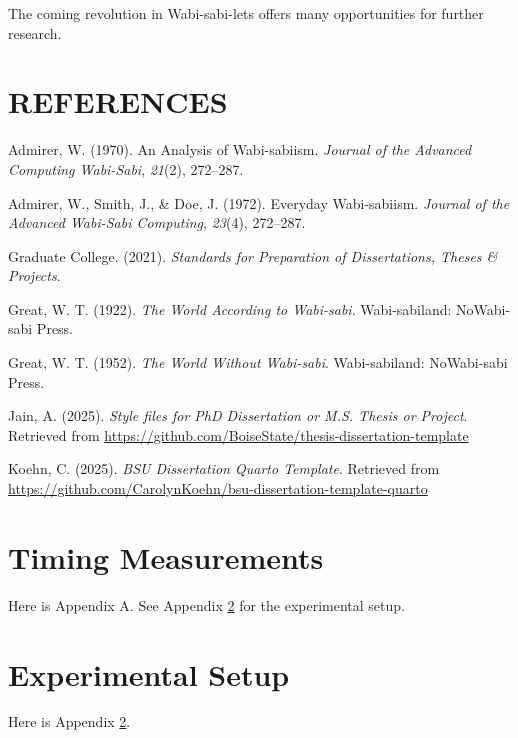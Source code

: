 \documentclass[
  dissertation]{bsu-cs}
\newlength{\cslhangindent}
\newenvironment{CSLReferences}[2] %
 {\begin{list}{}{%
  \setlength{\itemindent}{0pt}
  \setlength{\leftmargin}{0pt}
  \setlength{\parsep}{0pt}
  \ifodd #1
   \setlength{\leftmargin}{\cslhangindent}
   \setlength{\itemindent}{-1\cslhangindent}
  \fi
  \setlength{\itemsep}{#2\baselineskip}}}
 {\end{list}}
\begin{document}
The coming revolution in Wabi-sabi-lets offers many opportunities for
further research.

\backmatter

\chapter*{REFERENCES}

\label{refs}
\begin{CSLReferences}{1}{0}
Admirer, W. (1970). An {A}nalysis of {W}abi-sabiism. \emph{Journal of
the Advanced Computing Wabi-Sabi}, \emph{21}(2), 272--287.

Admirer, W., Smith, J., \& Doe, J. (1972). Everyday {W}abi-sabiism.
\emph{Journal of the Advanced Wabi-Sabi Computing}, \emph{23}(4),
272--287.

Graduate College. (2021). \emph{Standards for {P}reparation of
{D}issertations, {T}heses \& {P}rojects}.

Great, W. T. (1922). \emph{The {W}orld {A}ccording to {W}abi-sabi}.
Wabi-sabiland: NoWabi-sabi Press.

Great, W. T. (1952). \emph{The {W}orld {W}ithout {W}abi-sabi}.
Wabi-sabiland: NoWabi-sabi Press.

Jain, A. (2025). \emph{Style files for PhD {D}issertation or {M.S.}
Thesis or {P}roject}. Retrieved from
\url{https://github.com/BoiseState/thesis-dissertation-template}

Koehn, C. (2025). \emph{{BSU} {D}issertation {Q}uarto {T}emplate}.
Retrieved from
\url{https://github.com/CarolynKoehn/bsu-dissertation-template-quarto}

\end{CSLReferences}

\appendix

\chapter{Timing Measurements} \label{app-Timing}

Here is Appendix A. See Appendix \ref{app-Setup} for the experimental
setup.

\chapter{Experimental Setup} \label{app-Setup}

Here is Appendix \ref{app-Setup}.

\finish
\end{document}
